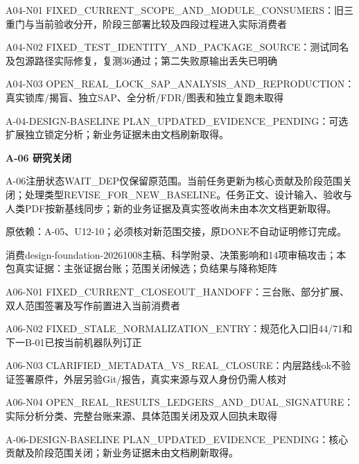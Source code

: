 \documentclass[11pt,a4paper]{article}
\newcommand{\reviewsection}[1]{\par\Needspace{5\baselineskip}\vspace{10pt}\begin{center}{\titlelatin\titlecjk\bfseries\fontsize{14}{20}\selectfont #1}\end{center}}
\begin{document}
A04-\allowbreak{}N01 FIXED\_\allowbreak{}CURRENT\_\allowbreak{}SCOPE\_\allowbreak{}AND\_\allowbreak{}MODULE\_\allowbreak{}CONSUMERS：旧三重门与当前验收分开，阶段三部署比较及四段过程进入实际消费者


A04-\allowbreak{}N02 FIXED\_\allowbreak{}TEST\_\allowbreak{}IDENTITY\_\allowbreak{}AND\_\allowbreak{}PACKAGE\_\allowbreak{}SOURCE：测试同名及包源路径实际修复，复测36通过；第二失败原输出丢失已明确


A04-\allowbreak{}N03 OPEN\_\allowbreak{}REAL\_\allowbreak{}LOCK\_\allowbreak{}SAP\_\allowbreak{}ANALYSIS\_\allowbreak{}AND\_\allowbreak{}REPRODUCTION：真实锁库/\allowbreak{}揭盲、独立SAP、全分析/\allowbreak{}FDR/\allowbreak{}图表和独立复跑未取得


A-\allowbreak{}04-\allowbreak{}DESIGN-\allowbreak{}BASELINE PLAN\_\allowbreak{}UPDATED\_\allowbreak{}EVIDENCE\_\allowbreak{}PENDING：可选扩展独立锁定分析；新业务证据未由文档刷新取得。


\reviewsection{A-\allowbreak{}06 研究关闭}
A-\allowbreak{}06注册状态WAIT\_\allowbreak{}DEP仅保留原范围。当前任务更新为核心贡献及阶段范围关闭；处理类型REVISE\_\allowbreak{}FOR\_\allowbreak{}NEW\_\allowbreak{}BASELINE。任务正文、设计输入、验收与人类PDF按新基线同步；新的业务证据及真实签收尚未由本次文档更新取得。


原依赖：A-\allowbreak{}05、U12-\allowbreak{}10；必须核对新范围交接，原DONE不自动证明修订完成。


消费design-\allowbreak{}foundation-\allowbreak{}20261008主稿、科学附录、决策影响和14项审稿攻击；本包真实证据：主张证据台账；范围关闭候选；负结果与降称矩阵


A06-\allowbreak{}N01 FIXED\_\allowbreak{}CURRENT\_\allowbreak{}CLOSEOUT\_\allowbreak{}HANDOFF：三台账、部分扩展、双人范围签署及写作前置进入当前消费者


A06-\allowbreak{}N02 FIXED\_\allowbreak{}STALE\_\allowbreak{}NORMALIZATION\_\allowbreak{}ENTRY：规范化入口旧44/\allowbreak{}71和下一B-\allowbreak{}01已按当前机器队列订正


A06-\allowbreak{}N03 CLARIFIED\_\allowbreak{}METADATA\_\allowbreak{}VS\_\allowbreak{}REAL\_\allowbreak{}CLOSURE：内层路线ok不验证签署原件，外层另验Git/\allowbreak{}报告，真实来源与双人身份仍需人核对


A06-\allowbreak{}N04 OPEN\_\allowbreak{}REAL\_\allowbreak{}RESULTS\_\allowbreak{}LEDGERS\_\allowbreak{}AND\_\allowbreak{}DUAL\_\allowbreak{}SIGNATURE：实际分析分类、完整台账来源、具体范围关闭及双人回执未取得


A-\allowbreak{}06-\allowbreak{}DESIGN-\allowbreak{}BASELINE PLAN\_\allowbreak{}UPDATED\_\allowbreak{}EVIDENCE\_\allowbreak{}PENDING：核心贡献及阶段范围关闭；新业务证据未由文档刷新取得。
\end{document}
